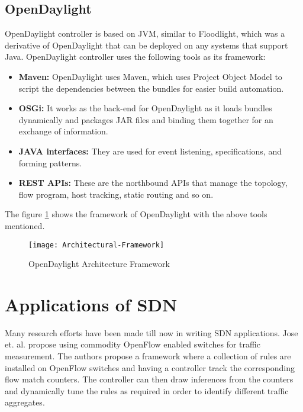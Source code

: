 \subsection{OpenDaylight} \label{Opendaylight}
OpenDaylight controller is based on \gls{JVM}, similar to Floodlight, which was a derivative of OpenDaylight that can be deployed on any systems that support Java. OpenDaylight controller uses the following tools as its framework:

\begin{itemize}
	\item \textbf{Maven:} OpenDaylight uses Maven, which uses Project Object Model to script the dependencies between the bundles for easier build automation.
	\item \textbf{OSGi:} It works as the back-end for OpenDaylight as it loads bundles dynamically and packages JAR files and binding them together for an exchange of information.
	\item \textbf{JAVA interfaces:} They are used for event listening, specifications, and forming patterns. 
	\item \textbf{REST APIs:} These are the northbound APIs that manage the topology, flow program, host tracking, static routing and so on.
	
\end{itemize}

The figure \ref{fig:OpenDaylight_framework} shows the framework of OpenDaylight with the above tools mentioned.

\begin{figure}
	\centering
	\texttt{[image: Architectural-Framework]}
	\caption{OpenDaylight Architecture Framework \cite{OpenDaylight_framework}} \label{fig:OpenDaylight_framework}
	\vspace{-10pt}
\end{figure}

\section{Applications of SDN} \label{SDN_applications}

Many research efforts have been made till now in writing SDN applications. Jose et. al. \cite{jose2011online} propose using commodity OpenFlow enabled switches for traffic measurement. The authors propose a framework where a collection of rules are installed on OpenFlow switches and having a controller track the corresponding flow match counters. The controller can then draw inferences from the counters and dynamically tune the rules as required in order to identify different traffic aggregates.

